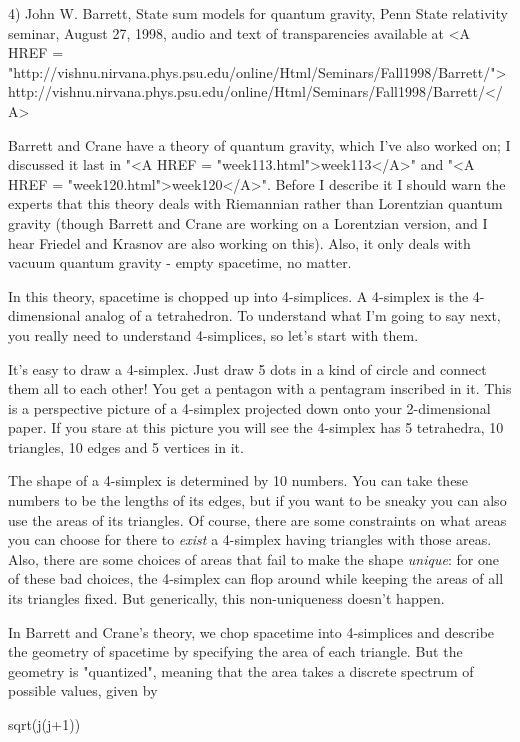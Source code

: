 4) John W. Barrett, State sum models for quantum gravity, Penn State
relativity seminar, August 27, 1998, audio and text of transparencies
available at 
<A HREF = "http://vishnu.nirvana.phys.psu.edu/online/Html/Seminars/Fall1998/Barrett/">http://vishnu.nirvana.phys.psu.edu/online/Html/Seminars/Fall1998/Barrett/</A>


Barrett and Crane have a theory of quantum gravity, which I've also
worked on; I discussed it last in "<A HREF = "week113.html">week113</A>" and "<A HREF = "week120.html">week120</A>".  Before I
describe it I should warn the experts that this theory deals with 
Riemannian rather than Lorentzian quantum gravity (though Barrett and
Crane are working on a Lorentzian version, and I hear Friedel and
Krasnov are also working on this).   Also, it only deals with vacuum
quantum gravity - empty spacetime, no matter.  

In this theory, spacetime is chopped up into 4-simplices.  A 4-simplex 
is the 4-dimensional analog of a tetrahedron.  To understand what I'm 
going to say next, you really need to understand 4-simplices, so let's 
start with them.

It's easy to draw a 4-simplex.  Just draw 5 dots in a kind of circle and
connect them all to each other!   You get a pentagon with a pentagram
inscribed in it.   This is a perspective picture of a 4-simplex
projected down onto your 2-dimensional paper.  If you stare at this
picture you will see the 4-simplex has 5 tetrahedra, 10 triangles, 
10 edges and 5 vertices in it.  

The shape of a 4-simplex is determined by 10 numbers.  You can take
these numbers to be the lengths of its edges, but if you want to be
sneaky you can also use the areas of its triangles.  Of course, there
are some constraints on what areas you can choose for there to \emph{exist} 
a
4-simplex having triangles with those areas.   Also, there are some
choices of areas that fail to make the shape \emph{unique}: for one of these
bad choices, the 4-simplex can flop around while keeping the areas of
all its triangles fixed.  But generically, this non-uniqueness doesn't
happen.  

In Barrett and Crane's theory, we chop spacetime into 4-simplices and 
describe the geometry of spacetime by specifying the area of each
triangle.  But the geometry is "quantized", meaning that the area
takes a discrete spectrum of possible values, given by 

                          sqrt(j(j+1))

